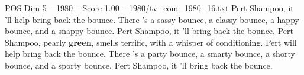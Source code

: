 \begin{textsample}{POS Dim 5 – 1980 – Score 1.00 – 1980/tv\_com\_1980\_16.txt}  \label{ex:f5_pos_012}
Pert Shampoo, it 'll help bring back the bounce.
There 's a sassy bounce, a classy bounce, a happy bounce, and a snappy bounce.
Pert Shampoo, it 'll bring back the bounce.
Pert Shampoo, pearly \textbf{green}, smells terrific, with a whisper of conditioning.
Pert will help bring back the bounce.
There 's a party bounce, a smarty bounce, a shorty bounce, and a sporty bounce.
Pert Shampoo, it 'll bring back the bounce.

\end{textsample}
